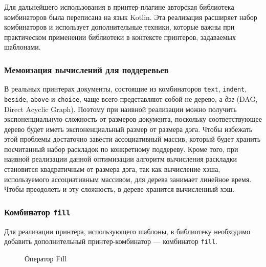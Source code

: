 


Для дальнейшего использования в принтер-плагине авторская библиотека комбинаторов
была переписана на язык Kotlin.
Эта реализация расширяет набор комбинаторов и использует
дополнительные техники, которые важны при практическом применении библиотеки в
контексте принтеров, задаваемых шаблонами.

\subsubsection{Мемоизация вычислений для поддеревьев}

В реальных принтерах документы, состоящие из комбинаторов
\lstinline[language=Haskell]{text},
\lstinline[language=Haskell]{indent},
\lstinline[language=Haskell]{beside},
\lstinline[language=Haskell]{above} и \lstinline[language=Haskell]{choice}, чаще всего
представляют собой не дерево, а \emph{дэг} (DAG, Direct Acyclic Graph). Поэтому при наивной
реализации можно получить экспоненциальную сложность от размеров документа,
поскольку соответствующее дерево будет иметь экспоненциальный размер от размера дэга.
Чтобы избежать этой проблемы достаточно завести ассоциативный массив,
который будет хранить посчитанный набор раскладок по конкретному поддереву.
Кроме того, при наивной реализации данной оптимизации
алгоритм вычисления раскладки становится квадратичным от размера дэга,
так как вычисление хэша, используемого ассоциативным массивом, для дерева занимает
линейное время. Чтобы преодолеть и эту сложность, в дереве хранится вычисленный хэш.

\subsubsection{Комбинатор \lstinline{fill}}

Для реализации принтера, использующего шаблоны, в библиотеку необходимо добавить
дополнительный принтер-комбинатор --- комбинатор \lstinline{fill}.

\begin{figure}[h!]
  \centering
	\quad
	\caption{Оператор Fill}
\end{figure}

